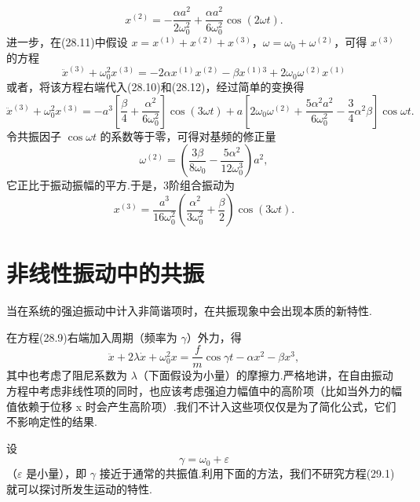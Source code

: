 \begin{equation}
  x^{(2)}=-\frac{\alpha a^2}{2\omega_0^2}+\frac{\alpha a^2}{6\omega_0^2}\cos(2\omega t).
\end{equation}
进一步，在(28.11)中假设 $x=x^{(1)}+x^{(2)}+x^{(3)}$，$\omega=\omega_0+\omega^{(2)}$，可得 $x^{(3)}$ 的方程
\begin{equation*}
  \ddot{x}^{(3)}+\omega_0^2x^{(3)}
  =-2\alpha x^{(1)}x^{(2)}-\beta x^{(1)3}+2\omega_0\omega^{(2)}x^{(1)}
\end{equation*}
或者，将该方程右端代入(28.10)和(28.12)，经过简单的变换得
\begin{equation*}
  \ddot{x}^{(3)}+\omega_0^2x^{(3)}
  =-a^3\left[\frac{\beta}{4}+\frac{\alpha^2}{6\omega_0^2}\right]\cos(3\omega t)
  +a\left[2\omega_0\omega^{(2)}+\frac{5\alpha^2a^2}{6\omega_0^2}
  -\frac{3}{4}\alpha^2\beta\right]\cos\omega t.
\end{equation*}
令共振因子 $\cos\omega t$ 的系数等于零，可得对基频的修正量
\begin{equation}
  \omega^{(2)}=\left(\frac{3\beta}{8\omega_0}
  -\frac{5\alpha^2}{12\omega_0^3}\right)a^2,
\end{equation}
它正比于振动振幅的平方.于是，3阶组合振动为
\begin{equation}
  x^{(3)}=\frac{a^3}{16\omega_0^2}\left(\frac{\alpha^2}{3\omega_0^2}+\frac{\beta}{2}\right)
  \cos(3\omega t).
\end{equation}

\section{非线性振动中的共振}

当在系统的强迫振动中计入非简谐项时，在共振现象中会出现本质的新特性.

在方程(28.9)右端加入周期（频率为 $\gamma$）外力，得
\begin{equation}
  \ddot{x}+2\lambda\dot{x}+\omega_0^2x=\frac{f}{m}\cos\gamma t-\alpha x^2-\beta x^3,
\end{equation}
其中也考虑了阻尼系数为 $\lambda$（下面假设为小量）的摩擦力.严格地讲，在自由振动方程中考虑非线性项的同时，也应该考虑强迫力幅值中的高阶项（比如当外力的幅值依赖于位移 x 时会产生高阶项）.我们不计入这些项仅仅是为了简化公式，它们不影响定性的结果.

设
\begin{equation*}
  \gamma=\omega_0+\varepsilon
\end{equation*}
（$\varepsilon$ 是小量），即 $\gamma$ 接近于通常的共振值.利用下面的方法，我们不研究方程(29.1)就可以探讨所发生运动的特性.

